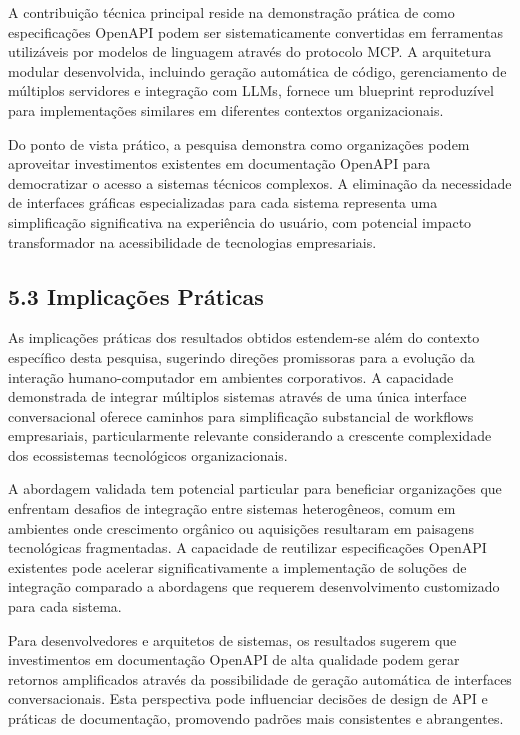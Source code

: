 \documentclass[
]{article}
\begin{document}
A contribuição técnica principal reside na demonstração prática de como
especificações OpenAPI podem ser sistematicamente convertidas em
ferramentas utilizáveis por modelos de linguagem através do protocolo
MCP. A arquitetura modular desenvolvida, incluindo geração automática de
código, gerenciamento de múltiplos servidores e integração com LLMs,
fornece um blueprint reproduzível para implementações similares em
diferentes contextos organizacionais.

Do ponto de vista prático, a pesquisa demonstra como organizações podem
aproveitar investimentos existentes em documentação OpenAPI para
democratizar o acesso a sistemas técnicos complexos. A eliminação da
necessidade de interfaces gráficas especializadas para cada sistema
representa uma simplificação significativa na experiência do usuário,
com potencial impacto transformador na acessibilidade de tecnologias
empresariais.

\subsection{5.3 Implicações
Práticas}\label{implicauxe7uxf5es-pruxe1ticas}

As implicações práticas dos resultados obtidos estendem-se além do
contexto específico desta pesquisa, sugerindo direções promissoras para
a evolução da interação humano-computador em ambientes corporativos. A
capacidade demonstrada de integrar múltiplos sistemas através de uma
única interface conversacional oferece caminhos para simplificação
substancial de workflows empresariais, particularmente relevante
considerando a crescente complexidade dos ecossistemas tecnológicos
organizacionais.

A abordagem validada tem potencial particular para beneficiar
organizações que enfrentam desafios de integração entre sistemas
heterogêneos, comum em ambientes onde crescimento orgânico ou aquisições
resultaram em paisagens tecnológicas fragmentadas. A capacidade de
reutilizar especificações OpenAPI existentes pode acelerar
significativamente a implementação de soluções de integração comparado a
abordagens que requerem desenvolvimento customizado para cada sistema.

Para desenvolvedores e arquitetos de sistemas, os resultados sugerem que
investimentos em documentação OpenAPI de alta qualidade podem gerar
retornos amplificados através da possibilidade de geração automática de
interfaces conversacionais. Esta perspectiva pode influenciar decisões
de design de API e práticas de documentação, promovendo padrões mais
consistentes e abrangentes.
\end{document}
